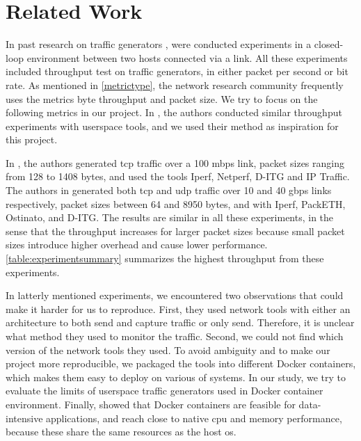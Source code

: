 \chapter{Related Work}\label{relatedwork}

In past research on traffic generators \cite{botta2010you, turull2016pktgen, kolahi2011performance, srivastava2014evaluation, srivastava2014comparative}, were conducted experiments in a closed-loop environment between two hosts connected via a link.
All these experiments included throughput test on traffic generators, in either packet per second or bit rate.
As mentioned in \cref{metrictype}, the network research community frequently uses the metrics byte throughput and packet size.
We try to focus on the following metrics in our project.
In \cite{kolahi2011performance, srivastava2014evaluation, srivastava2014comparative}, the authors conducted similar throughput experiments with userspace tools, and we used their method as inspiration for this project.

\skippara In \cite{kolahi2011performance}, the authors generated \acrshort{tcp} traffic over a 100 \acrshort{mbps} link, packet sizes ranging from 128 to 1408 bytes, and used the tools Iperf, Netperf, D-ITG and IP Traffic.
The authors in \cite{srivastava2014evaluation, srivastava2014comparative} generated both \acrshort{tcp} and \acrshort{udp} traffic over 10 and 40 \acrshort{gbps} links respectively, packet sizes between 64 and 8950 bytes, and with Iperf, PackETH, Ostinato, and D-ITG.
The results are similar in all these experiments, in the sense that the throughput increases for larger packet sizes because small packet sizes introduce higher overhead and cause lower performance.
\cref{table:experimentsummary} summarizes the highest throughput from these experiments.



\skippara In latterly mentioned experiments, we encountered two observations that could make it harder for us to reproduce.
First, they used network tools with either an architecture to both send and capture traffic or only send.
Therefore, it is unclear what method they used to monitor the traffic.
Second, we could not find which version of the network tools they used.
To avoid ambiguity and to make our project more reproducible, we packaged the tools into different Docker containers, which makes them easy to deploy on various of systems.
In our study, we try to evaluate the limits of userspace traffic generators used in Docker container environment.
Finally, \cite{felter2015updated, chung2016using} showed that Docker containers are feasible for data-intensive applications, and reach close to native \acrshort{cpu} and memory performance, because these share the same resources as the host \acrshort{os}.



